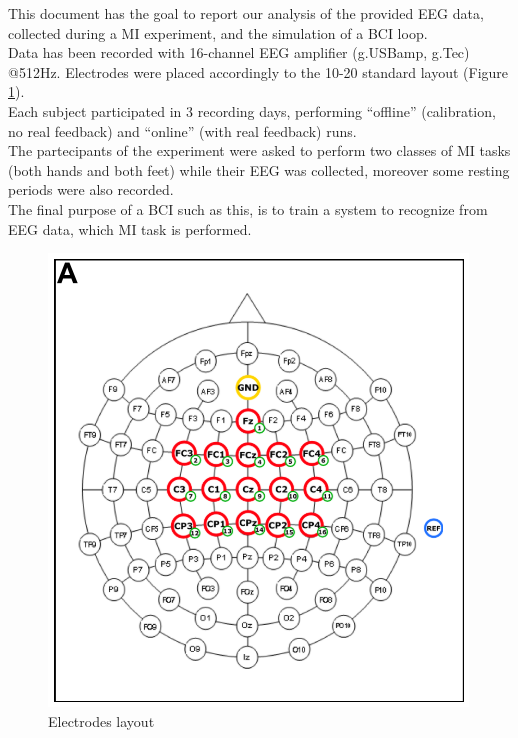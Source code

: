 This document has the goal to report our analysis of the provided EEG data, collected during a MI experiment, and the simulation of a BCI loop. \\
Data has been recorded with 16-channel EEG amplifier (g.USBamp, g.Tec) @512Hz. Electrodes were placed accordingly to the 10-20 standard layout (Figure \ref{fig:electrodes_layout}). \\
Each subject participated in 3 recording days, performing  “offline” (calibration, no real feedback) and  “online” (with real feedback) runs. \\
The partecipants of the experiment were asked to perform two classes of MI tasks (both hands and both feet) while their EEG was collected, moreover some resting periods were also recorded.\\
The final purpose of a BCI such as this, is to train a system to recognize from EEG data, which MI task is performed.

\begin{figure}[h!]
	\begin{center}
		 \includegraphics[width=0.4\linewidth]{img/electrodes_layout.PNG}
	\end{center}

	 \caption{Electrodes layout}
	 \label{fig:electrodes_layout}
\end{figure}